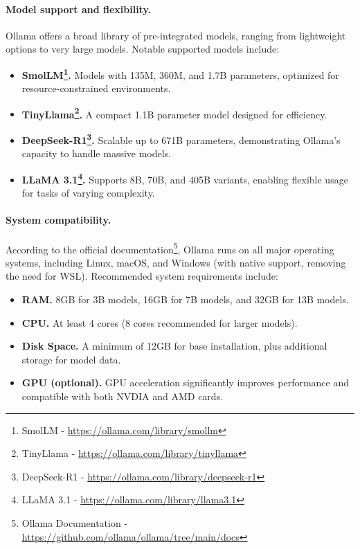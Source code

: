 \paragraph*{Model support and flexibility.} Ollama offers a broad library of pre-integrated models, ranging from lightweight options to very large models. Notable supported models include:
\begin{itemize}
	\item \textbf{SmolLM\footnote{SmolLM -  \url{https://ollama.com/library/smollm}}.} Models with 135M, 360M, and 1.7B parameters, optimized for resource-constrained environments.
	\item \textbf{TinyLlama\footnote{TinyLlama -  \url{https://ollama.com/library/tinyllama}}.} A compact 1.1B parameter model designed for efficiency.
	\item \textbf{DeepSeek-R1\footnote{DeepSeek-R1 - \url{https://ollama.com/library/deepseek-r1}}.} Scalable up to 671B parameters, demonstrating Ollama’s capacity to handle massive models.
	\item \textbf{LLaMA 3.1\footnote{LLaMA 3.1 - \url{https://ollama.com/library/llama3.1}}.} Supports 8B, 70B, and 405B variants, enabling flexible usage for tasks of varying complexity.
\end{itemize}

\vspace{0.5em}
\paragraph*{System compatibility.} According to the official documentation\footnote{Ollama Documentation - \url{https://github.com/ollama/ollama/tree/main/docs}}, Ollama runs on all major operating systems, including Linux, macOS, and Windows (with native support, removing the need for WSL). Recommended system requirements include:
\begin{itemize}
	\item \textbf{RAM.} 8GB for 3B models, 16GB for 7B models, and 32GB for 13B models.
	\item \textbf{CPU.} At least 4 cores (8 cores recommended for larger models).
	\item \textbf{Disk Space.} A minimum of 12GB for base installation, plus additional storage for model data.
	\item \textbf{GPU (optional).} GPU acceleration significantly improves performance and compatible with both NVDIA and AMD cards.
\end{itemize}

